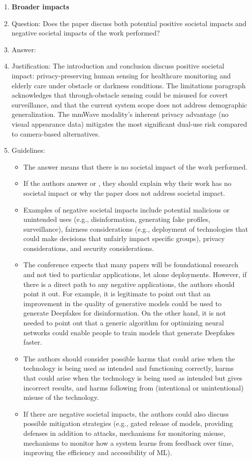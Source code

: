 \begin{enumerate}
\item {\bf Broader impacts}
    \item[] Question: Does the paper discuss both potential positive societal impacts and negative societal impacts of the work performed?
    \item[] Answer: \answerYes{}
    \item[] Justification: The introduction and conclusion discuss positive societal impact: privacy-preserving human sensing for healthcare monitoring and elderly care under obstacle or darkness conditions. The limitations paragraph acknowledges that through-obstacle sensing could be misused for covert surveillance, and that the current system scope does not address demographic generalization. The mmWave modality's inherent privacy advantage (no visual appearance data) mitigates the most significant dual-use risk compared to camera-based alternatives.
    \item[] Guidelines:
    \begin{itemize}
        \item The answer \answerNA{} means that there is no societal impact of the work performed.
        \item If the authors answer \answerNA{} or \answerNo, they should explain why their work has no societal impact or why the paper does not address societal impact.
        \item Examples of negative societal impacts include potential malicious or unintended uses (e.g., disinformation, generating fake profiles, surveillance), fairness considerations (e.g., deployment of technologies that could make decisions that unfairly impact specific groups), privacy considerations, and security considerations.
        \item The conference expects that many papers will be foundational research and not tied to particular applications, let alone deployments. However, if there is a direct path to any negative applications, the authors should point it out. For example, it is legitimate to point out that an improvement in the quality of generative models could be used to generate Deepfakes for disinformation. On the other hand, it is not needed to point out that a generic algorithm for optimizing neural networks could enable people to train models that generate Deepfakes faster.
        \item The authors should consider possible harms that could arise when the technology is being used as intended and functioning correctly, harms that could arise when the technology is being used as intended but gives incorrect results, and harms following from (intentional or unintentional) misuse of the technology.
        \item If there are negative societal impacts, the authors could also discuss possible mitigation strategies (e.g., gated release of models, providing defenses in addition to attacks, mechanisms for monitoring misuse, mechanisms to monitor how a system learns from feedback over time, improving the efficiency and accessibility of ML).
    \end{itemize}


\end{enumerate}
